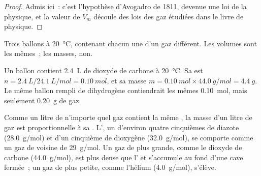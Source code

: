 \begin{proof}
Admis ici~: c'est l'hypothèse d'Avogadro de 1811, devenue une loi de la
physique, et la valeur de $V_m$ découle des lois des gaz étudiées dans
le livre de physique.
\end{proof}

\begin{omfigure}

{\small Trois ballons à \qty{20}{\celsius}, contenant chacun une 
d'un gaz différent. Les volumes sont les mêmes~; les masses, non.}
\end{omfigure}


\begin{example}\label{ex:g10:the-mole:balloon}
Un ballon contient \qty{2.4}{L} de dioxyde de carbone à
\qty{20}{\celsius}. Sa  est
$n = \qty{2.4}{L} / \qty{24.1}{L/mol} = \qty{0.10}{mol}$,
et sa masse $m = \qty{0.10}{mol} \times \qty{44.0}{g/mol} =
\qty{4.4}{g}$. Le même ballon rempli de dihydrogène contiendrait les
mêmes \qty{0.10}{mol}, mais seulement \qty{0.20}{g} de gaz.
\end{example}

\begin{remark}\label{rem:g10:the-mole:heavy}
Comme un litre de n'importe quel gaz contient la même , la masse d'un litre de gaz est proportionnelle à sa . L', un  d'environ quatre cinquièmes de diazote
(\qty{28.0}{g/mol}) et d'un cinquième de dioxygène (\qty{32.0}{g/mol}),
se comporte comme un gaz de  voisine de \qty{29}{g/mol}. Un
gaz de  plus grande, comme le dioxyde de carbone
(\qty{44.0}{g/mol}), est plus dense que l' et s'accumule au fond d'une
cave fermée~; un gaz de  plus petite, comme l'hélium
(\qty{4.0}{g/mol}), s'élève.
\end{remark}

